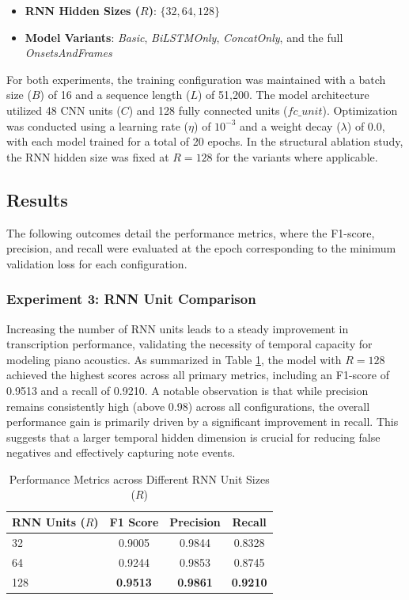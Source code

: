 \documentclass{article}
\begin{document}
\begin{itemize}
    \item \textbf{RNN Hidden Sizes ($R$)}: $\{32, 64, 128\}$
    \item \textbf{Model Variants}: \textit{Basic}, \textit{BiLSTMOnly}, \textit{ConcatOnly}, and the full \textit{OnsetsAndFrames}
\end{itemize}

For both experiments, the training configuration was maintained with a batch size ($B$) of 16 and a sequence length ($L$) of 51,200. The model architecture utilized 48 CNN units ($C$) and 128 fully connected units ($fc\_unit$). Optimization was conducted using a learning rate ($\eta$) of $10^{-3}$ and a weight decay ($\lambda$) of $0.0$, with each model trained for a total of 20 epochs. In the structural ablation study, the RNN hidden size was fixed at $R = 128$ for the variants where applicable.

\subsection{Results}

The following outcomes detail the performance metrics, where the F1-score, precision, and recall were evaluated at the epoch corresponding to the minimum validation loss for each configuration.

\subsubsection{Experiment 3: RNN Unit Comparison}
Increasing the number of RNN units leads to a steady improvement in transcription performance, validating the necessity of temporal capacity for modeling piano acoustics. As summarized in Table \ref{tab:rnn_results}, the model with $R=128$ achieved the highest scores across all primary metrics, including an F1-score of 0.9513 and a recall of 0.9210. A notable observation is that while precision remains consistently high (above 0.98) across all configurations, the overall performance gain is primarily driven by a significant improvement in recall. This suggests that a larger temporal hidden dimension is crucial for reducing false negatives and effectively capturing note events.

\begin{table}[ht]
  \caption{Performance Metrics across Different RNN Unit Sizes ($R$)}
  \label{tab:rnn_results}
  \centering
  \begin{tabular}{lccc}
    \toprule
    RNN Units ($R$) & F1 Score & Precision & Recall \\
    \midrule
    32  & 0.9005 & 0.9844 & 0.8328 \\
    64  & 0.9244 & 0.9853 & 0.8745 \\
    128 & \textbf{0.9513} & \textbf{0.9861} & \textbf{0.9210} \\
    \bottomrule
  \end{tabular}
\end{table}
\end{document}
